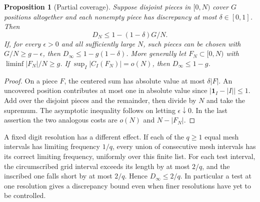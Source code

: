 \documentclass[11pt]{article}
\newtheorem{proposition}[theorem]{Proposition}
\begin{document}
\begin{proposition}[Partial coverage]\label{prop:cover}
Suppose disjoint pieces in \([0,N)\) cover \(G\) positions altogether and each nonempty piece has discrepancy at most \(\delta\in[0,1]\). Then
\begin{equation}\label{eq:covered}
 D_N\le 1-(1-\delta)G/N .
\end{equation}
If, for every \(\epsilon>0\) and all sufficiently large \(N\), such pieces can be chosen with \(G/N\ge g-\epsilon\), then \(D_\infty\le1-g(1-\delta)\). More generally let \(F_N\subset[0,N)\) with \(\liminf |F_N|/N\ge g\). If \(\sup_I|C_I(F_N)|=o(N)\), then \(D_\infty\le1-g\).
\end{proposition}
\begin{proof}
On a piece \(F\), the centered sum has absolute value at most \(\delta |F|\). An uncovered position contributes at most one in absolute value since \(|\mathbf1_I-|I||\le1\). Add over the disjoint pieces and the remainder, then divide by \(N\) and take the supremum. The asymptotic inequality follows on letting \(\epsilon\downarrow0\). In the last assertion the two analogous costs are \(o(N)\) and \(N-|F_N|\).
\end{proof}
A fixed digit resolution has a different effect. If each of the \(q\ge1\) equal mesh intervals has limiting frequency \(1/q\), every union of consecutive mesh intervals has its correct limiting frequency, uniformly over this finite list. For each test interval, the circumscribed grid interval exceeds its length by at most \(2/q\), and the inscribed one falls short by at most \(2/q\). Hence \(D_\infty\le2/q\). In particular a test at one resolution gives a discrepancy bound even when finer resolutions have yet to be controlled.
\end{document}

